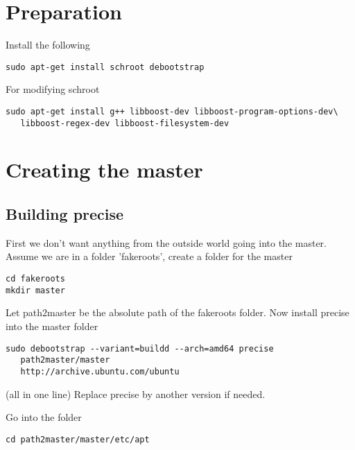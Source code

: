 \documentclass[a4paper]{book}
\begin{document}
\section{Preparation}

Install the following

\begin{verbatim}
sudo apt-get install schroot debootstrap
\end{verbatim}

For modifying schroot

\begin{verbatim}
sudo apt-get install g++ libboost-dev libboost-program-options-dev\
   libboost-regex-dev libboost-filesystem-dev
\end{verbatim}


\section{Creating the master}
\subsection{Building precise}
First we don't want anything from the outside world going into the master.
Assume we are in a folder 'fakeroots', create a folder for the master

\begin{verbatim}
cd fakeroots
mkdir master
\end{verbatim}

Let path2master be the absolute path of the fakeroots folder.
Now install precise into the master folder

\begin{verbatim}
sudo debootstrap --variant=buildd --arch=amd64 precise 
   path2master/master 
   http://archive.ubuntu.com/ubuntu
\end{verbatim}

(all in one line)
Replace precise by another version if needed.

Go into the folder

\begin{verbatim}
cd path2master/master/etc/apt
\end{verbatim}
\end{document}
